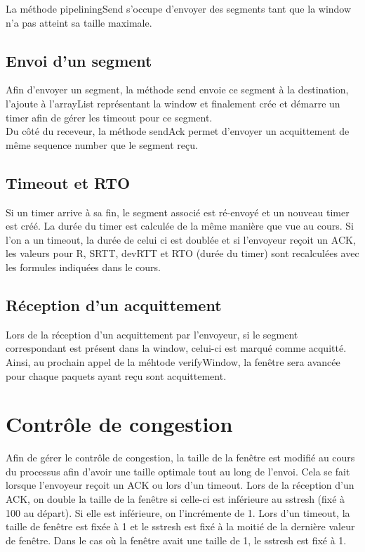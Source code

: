 \documentclass{article}
\begin{document}
La méthode pipeliningSend s'occupe d'envoyer des segments tant que la window n'a pas atteint sa taille maximale.

\subsection{Envoi d'un segment}

Afin d'envoyer un segment, la méthode send envoie ce segment à la destination, l'ajoute à l'arrayList représentant la window et finalement crée et démarre un timer afin de gérer les timeout pour ce segment.\\
Du côté du receveur, la méthode sendAck permet d'envoyer un acquittement de même sequence number que le segment reçu.

\subsection{Timeout et RTO}

Si un timer arrive à sa fin, le segment associé est ré-envoyé et un nouveau timer est créé. 
La durée du timer est calculée de la même manière que vue au cours.
Si l'on a un timeout, la durée de celui ci est doublée et si l'envoyeur reçoit un ACK, les valeurs pour R, SRTT, devRTT et RTO (durée du timer) sont recalculées avec les formules indiquées dans le cours.

\subsection{Réception d'un acquittement}

Lors de la réception d'un acquittement par l'envoyeur, si le segment correspondant est présent dans la window, celui-ci est marqué comme acquitté.
Ainsi, au prochain appel de la méhtode verifyWindow, la fenêtre sera avancée pour chaque paquets ayant reçu sont acquittement. 

\section{Contrôle de congestion}

Afin de gérer le contrôle de congestion, la taille de la fenêtre est modifié au cours du processus afin d'avoir une taille optimale tout au long de l'envoi.
Cela se fait lorsque l'envoyeur reçoit un ACK ou lors d'un timeout.
Lors de la réception d'un ACK, on double la taille de la fenêtre si celle-ci est inférieure au sstresh (fixé à 100 au départ). Si elle est inférieure, on l'incrémente de 1.
Lors d'un timeout, la taille de fenêtre est fixée à 1 et le sstresh est fixé à la moitié de la dernière valeur de fenêtre. Dans le cas où la fenêtre avait une taille de 1, le sstresh est fixé à 1.
\end{document}
